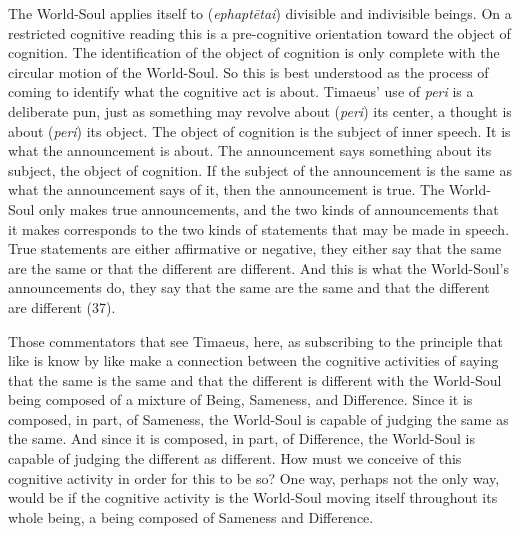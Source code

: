 The World-Soul applies itself to (\emph{ephaptētai}) divisible and indivisible beings. On a restricted cognitive reading this is a pre-cognitive orientation toward the object of cognition. The identification of the object of cognition is only complete with the circular motion of the World-Soul. So this is best understood as the process of coming to identify what the cognitive act is about. Timaeus' use of \emph{peri} is a deliberate pun, just as something may revolve about (\emph{peri}) its center, a thought is about (\emph{peri}) its object. The object of cognition is the subject of inner speech. It is what the announcement is about. The announcement says something about its subject, the object of cognition. If the subject of the announcement is the same as what the announcement says of it, then the announcement is true. The World-Soul only makes true announcements, and the two kinds of announcements that it makes corresponds to the two kinds of statements that may be made in speech. True statements are either affirmative or negative, they either say that the same are the same or that the different are different. And this is what the World-Soul's announcements do, they say that the same are the same and that the different are different (37).

Those commentators that see Timaeus, here, as subscribing to the principle that like is know by like make a connection between the cognitive activities of saying that the same is the same and that the different is different with the World-Soul being composed of a mixture of Being, Sameness, and Difference. Since it is composed, in part, of Sameness, the World-Soul is capable of judging the same as the same. And since it is composed, in part, of Difference, the World-Soul is capable of judging the different as different. How must we conceive of this cognitive activity in order for this to be so? One way, perhaps not the only way, would be if the cognitive activity is the World-Soul moving itself throughout its whole being, a being composed of Sameness and Difference.

